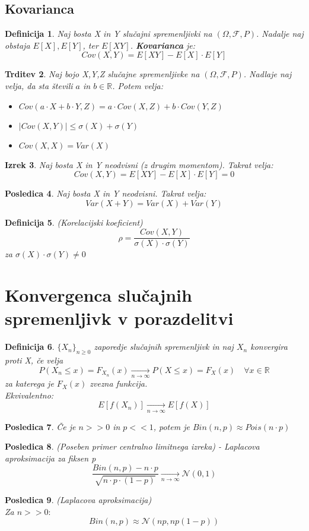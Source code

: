 \documentclass[11pt]{article}
\newtheorem{Izrek}{{\sc Izrek}}[section]
\newtheorem{Trditev}[Izrek]{{\sc Trditev}}
\newtheorem{Posledica}[Izrek]{{\sc Posledica}}
\newtheorem{Definicija}[Izrek]{{\sc Definicija}}
\begin{document}
\subsection{Kovarianca}
\begin{Definicija}
Naj bosta X in Y slučajni spremenljivki na $(\Omega,\mathcal{F},P)$. Nadalje naj obstaja $E[X], E[Y]$, ter $E[XY]$. \textbf{Kovarianca} je:
$$Cov(X,Y) = E[XY] - E[X] \cdot E[Y]$$
\end{Definicija}
\begin{Trditev} 
Naj bojo X,Y,Z slučajne spremenljivke na  $(\Omega,\mathcal{F},P)$. Nadlaje naj velja, da sta števili $a$ in $b\in \mathbb{R}$. Potem velja:
\begin{itemize}
\item
$Cov(a\cdot X + b\cdot Y, Z) = a \cdot Cov(X,Z) + b\cdot Cov(Y,Z)$
\item
$|Cov(X,Y)| \le \sigma (X) + \sigma (Y)$
\item
$Cov(X,X) = Var(X)$
\end{itemize}
\end{Trditev}
\begin{Izrek}
Naj bosta X in Y neodvisni (z drugim momentom). Takrat velja:
$$Cov(X,Y) = E[XY] - E[X] \cdot E[Y] = 0$$
\end{Izrek}
\begin{Posledica}
Naj bosta X in Y neodvisni. Takrat velja:
$$Var(X + Y) = Var(X) + Var(Y)$$
\end{Posledica}
\begin{Definicija}
(Korelacijski koeficient)
$$\rho  = \frac{Cov(X,Y)}{\sigma (X) \cdot \sigma (Y)}$$
za $\sigma (X) \cdot \sigma (Y) \neq 0$
\end{Definicija}
\section{Konvergenca slučajnih spremenljivk v porazdelitvi}
\begin{Definicija}
$ \{ X_n\}_{n \ge 0}$ zaporedje slučajnih spremenljivk in naj $ X_n$ konvergira proti X, če velja $$P(X_n \le x) = F_{X_n}(x)\xrightarrow[n\to \infty]{}  P(X \le x) = F_X(x) \quad \forall x \in \mathbb{R}$$ za katerega je $F_X(x)$ zvezna funkcija.
\\
Ekvivalentno:
$$E[f(X_n)]  \xrightarrow[n\to \infty]{} E[f(X)]$$
\end{Definicija}
\begin{Posledica}
Če je $n >>0$ in $p << 1$, potem je $Bin(n,p) \approx Pois(n\cdot p)$
\end{Posledica}
\begin{Posledica} (Poseben primer centralno limitnega izreka) - Laplacova aproksimacija za fiksen p
$$\frac{Bin(n,p) - n\cdot p}{\sqrt{n\cdot p \cdot (1-p)}} \xrightarrow[n\to \infty]{}  \mathcal{N}(0,1)$$
\end{Posledica}
\begin{Posledica} (Laplacova aproksimacija)
\\
Za $n>> 0:$
$$Bin(n,p) \approx \mathcal{N}({n p, np(1-p)})$$
\end{Posledica}
\end{document}

